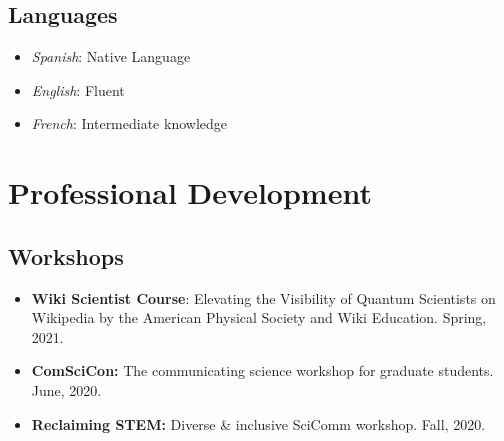 \documentclass[letterpaper,10pt]{article}
\begin{document}

\subsection*{Languages}


    \begin{multicols}{2}


\begin{itemize}[label=$\blacktriangleright$]
\item \emph{Spanish}: Native Language
\item \emph{English}: Fluent
\item \emph{French}: Intermediate knowledge
\end{itemize}

\end{multicols}


\section*{Professional Development}
\subsection*{Workshops}
\begin{itemize}[label=$\blacktriangleright$]
    \item  \textbf{Wiki Scientist Course}: Elevating the Visibility of Quantum Scientists on Wikipedia by the American Physical Society and Wiki Education. Spring, 2021.
    \item \textbf{ComSciCon:} The communicating science workshop for graduate students. June, 2020.
    \item \textbf{Reclaiming STEM:} Diverse \& inclusive SciComm workshop. Fall, 2020.
\end{itemize}
\end{document}
